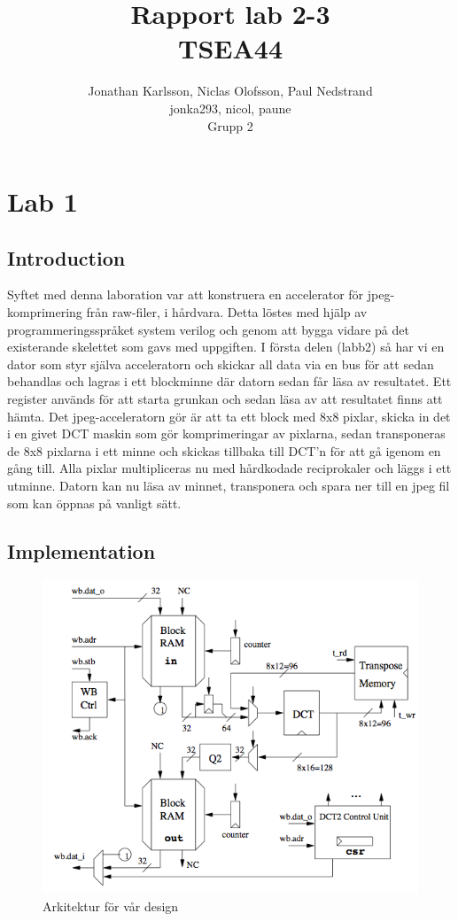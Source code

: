 \documentclass[a4paper]{article}
\author{Jonathan Karlsson, Niclas Olofsson, Paul Nedstrand\\jonka293, nicol, paune\\Grupp 2}
\title{Rapport lab 2-3\\ \vspace{2 mm} {\large TSEA44}}
\begin{document}
\maketitle

\newpage

\tableofcontents

\newpage
\section{Lab 1}
\subsection{Introduction}



Syftet med denna laboration var att konstruera en accelerator för jpeg-komprimering från raw-filer, i hårdvara. Detta löstes med hjälp av programmeringsspråket system verilog och genom att bygga vidare på det existerande skelettet som gavs med uppgiften. I första delen (labb2) så har vi en dator som styr själva acceleratorn och skickar all data via en bus för att sedan behandlas och lagras i ett blockminne där datorn sedan får läsa av resultatet. Ett register används för att starta grunkan och sedan läsa av att resultatet finns att hämta.
Det jpeg-acceleratorn gör är att ta ett block med 8x8 pixlar, skicka in det i en givet DCT maskin som gör komprimeringar av pixlarna, sedan transponeras de 8x8 pixlarna i ett minne och skickas tillbaka till DCT\rq{}n för att gå igenom en gång till. Alla pixlar multipliceras nu med hårdkodade reciprokaler och läggs i ett utminne. 
Datorn kan nu läsa av minnet, transponera och spara ner till en jpeg fil som kan öppnas på vanligt sätt.

\subsection{Implementation}



\begin{figure}[h]
\centering
\includegraphics[scale=0.5]{architecture.png}
\caption{Arkitektur för vår design}
\label{fig:architecture}
\end{figure}
\end{document}
